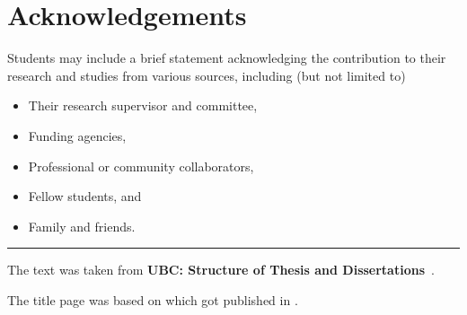 \section{Acknowledgements}

Students may include a brief statement acknowledging the contribution to their research and studies from various sources, including (but not limited  to)
\begin{itemize}
  \item Their research supervisor and committee,
  \item Funding agencies,
  \item Professional or community collaborators,
  \item Fellow students, and
  \item Family and friends.
\end{itemize}

\noindent\rule{\textwidth}{0.5pt}

\noindent The text was taken from {\bf UBC: Structure of Thesis and Dissertations}~\cite{ubcFormat}. \par
\noindent The title page was based on \cite{csiuThesis} which got published in \cite{siu2017}.
